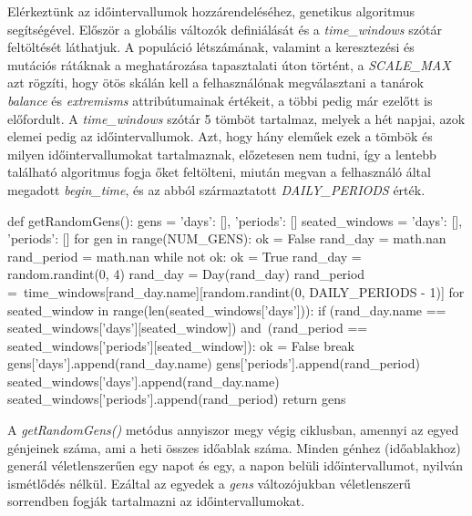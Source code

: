 \documentclass[12pt,a4paper]{report}
\begin{document}
Elérkeztünk az időintervallumok hozzárendeléséhez, genetikus algoritmus segítségével. Először a globális változók definiálását és a \textit{time\_windows} szótár feltöltését láthatjuk. A populáció létszámának, valamint a keresztezési és mutációs rátáknak a meghatározása tapasztalati úton történt, a \textit{SCALE\_MAX} azt rögzíti, hogy ötös skálán kell a felhasználónak megválasztani a tanárok \textit{balance} és \textit{extremisms} attribútumainak értékeit, a többi pedig már ezelőtt is előfordult. A \textit{time\_windows} szótár 5 tömböt tartalmaz, melyek a hét napjai, azok elemei pedig az időintervallumok. Azt, hogy hány eleműek ezek a tömbök és milyen időintervallumokat tartalmaznak, előzetesen nem tudni, így a lentebb található algoritmus fogja őket feltölteni, miután megvan a felhasználó által megadott \textit{begin\_time}, és az abból származtatott \textit{DAILY\_PERIODS} érték.

\begin{python}
def getRandomGens():
    gens = {'days': [], 'periods': []}
    seated_windows = {'days': [], 'periods': []}
    for gen in range(NUM_GENS):
        ok = False
        rand_day = math.nan
        rand_period = math.nan
        while not ok:
            ok = True
            rand_day = random.randint(0, 4)
            rand_day = Day(rand_day)
            rand_period =\
                time_windows[rand_day.name][random.randint(0, 
                DAILY_PERIODS - 1)]
            for seated_window in range(len(seated_windows['days'])):
                if (rand_day.name ==
                   seated_windows['days'][seated_window]) and\
                   (rand_period == 
                   seated_windows['periods'][seated_window]):
                    ok = False
                    break
        gens['days'].append(rand_day.name)
        gens['periods'].append(rand_period)
        seated_windows['days'].append(rand_day.name)
        seated_windows['periods'].append(rand_period)
    return gens
\end{python}

A \textit{getRandomGens()} metódus annyiszor megy végig ciklusban, amennyi az egyed génjeinek száma, ami a heti összes időablak száma. Minden génhez (időablakhoz) generál véletlenszerűen egy napot és egy, a napon belüli időintervallumot, nyilván ismétlődés nélkül. Ezáltal az egyedek a \textit{gens} változójukban véletlenszerű sorrendben fogják tartalmazni az időintervallumokat.
\end{document}

